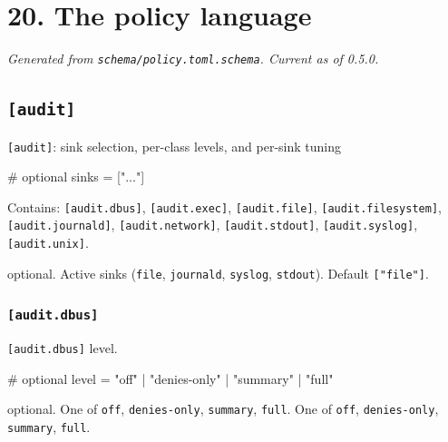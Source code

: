 \hypertarget{the-policy-language}{%
\chapter{20. The policy language}\label{the-policy-language}}

\emph{Generated from \texttt{schema/policy.toml.schema}. Current as of
0.5.0.}

\hypertarget{audit}{%
\section{\texorpdfstring{\texttt{{[}audit{]}}}{{[}audit{]}}}\label{audit}}

\texttt{{[}audit{]}}: sink selection, per-class levels, and per-sink
tuning

\begin{kennelcode}
[audit]
# optional
sinks    = ["..."]
\end{kennelcode}

Contains: \texttt{{[}audit.dbus{]}}, \texttt{{[}audit.exec{]}},
\texttt{{[}audit.file{]}}, \texttt{{[}audit.filesystem{]}},
\texttt{{[}audit.journald{]}}, \texttt{{[}audit.network{]}},
\texttt{{[}audit.stdout{]}}, \texttt{{[}audit.syslog{]}},
\texttt{{[}audit.unix{]}}.

\begin{description}
\tightlist
\item[\texttt{sinks}]
optional. Active sinks (\texttt{file}, \texttt{journald},
\texttt{syslog}, \texttt{stdout}). Default \texttt{{[}"file"{]}}.
\end{description}

\hypertarget{audit.dbus}{%
\subsection{\texorpdfstring{\texttt{{[}audit.dbus{]}}}{{[}audit.dbus{]}}}\label{audit.dbus}}

\texttt{{[}audit.dbus{]}} level.

\begin{kennelcode}
# optional
level    = "off" | "denies-only" | "summary" | "full"
\end{kennelcode}

\begin{description}
\tightlist
\item[\texttt{level}]
optional. One of \texttt{off}, \texttt{denies-only}, \texttt{summary},
\texttt{full}. One of \texttt{off}, \texttt{denies-only},
\texttt{summary}, \texttt{full}.
\end{description}


